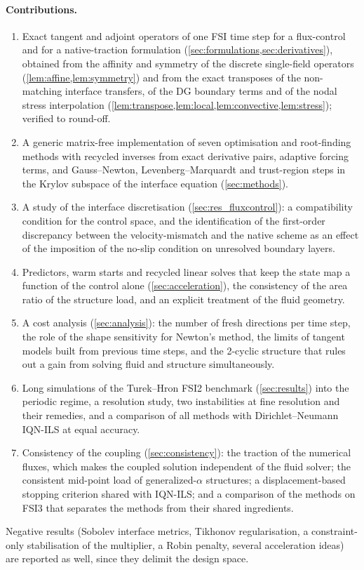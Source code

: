 \documentclass[11pt,a4paper]{article}
\theoremstyle{definition}
\theoremstyle{remark}
\begin{document}
\paragraph{Contributions.}
\begin{enumerate}
  \item Exact tangent and adjoint operators of one FSI time step for a flux-control and for a
  native-traction formulation (\cref{sec:formulations,sec:derivatives}), obtained from the affinity
  and symmetry of the discrete single-field operators (\cref{lem:affine,lem:symmetry}) and from the
  exact transposes of the non-matching interface transfers, of the DG boundary terms and of the
  nodal stress interpolation (\cref{lem:transpose,lem:local,lem:convective,lem:stress}); verified to
  round-off.
  \item A generic matrix-free implementation of seven optimisation and root-finding methods with
  recycled inverses from exact derivative pairs, adaptive forcing terms, and Gauss--Newton,
  Levenberg--Marquardt and trust-region steps in the Krylov subspace of the interface equation
  (\cref{sec:methods}).
  \item A study of the interface discretisation (\cref{sec:res_fluxcontrol}): a compatibility
  condition for the control space, and the identification of the first-order discrepancy between
  the velocity-mismatch and the native scheme as an effect of the imposition of the no-slip
  condition on unresolved boundary layers.
  \item Predictors, warm starts and recycled linear solves that keep the state map a function of
  the control alone (\cref{sec:acceleration}), the consistency of the area ratio of the structure
  load, and an explicit treatment of the fluid geometry.
  \item A cost analysis (\cref{sec:analysis}): the number of fresh directions per time step, the
  role of the shape sensitivity for Newton's method, the limits of tangent models built from
  previous time steps, and the 2-cyclic structure that rules out a gain from solving fluid and
  structure simultaneously.
  \item Long simulations of the Turek--Hron FSI2 benchmark (\cref{sec:results}) into the periodic
  regime, a resolution study, two instabilities at fine resolution and their remedies, and a
  comparison of all methods with Dirichlet--Neumann IQN-ILS at equal accuracy.
  \item Consistency of the coupling (\cref{sec:consistency}): the traction of the numerical fluxes,
  which makes the coupled solution independent of the fluid solver; the consistent mid-point load of
  generalized-$\alpha$ structures; a displacement-based stopping criterion shared with IQN-ILS; and
  a comparison of the methods on FSI3 that separates the methods from their shared ingredients.
\end{enumerate}
Negative results (Sobolev interface metrics, Tikhonov regularisation, a constraint-only
stabilisation of the multiplier, a Robin penalty, several acceleration ideas) are reported as well,
since they delimit the design space.
\end{document}
